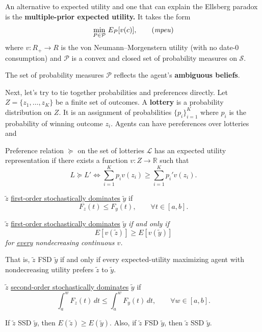 \documentclass[11pt,english]{article}
\begin{document}
\begin{definition} 
An alternative to expected utility and one that can explain the Ellsberg
paradox is the \textbf{multiple-prior expected utility.} It takes the form
\begin{equation}
    \min_{P \in \mathcal{P}}\, E_P[v(c)], \tag{\textit{mpeu}}
\end{equation}
where $v : R_+ \to R$ is the von Neumann--Morgenstern utility (with no date-0
consumption) and $\mathcal{P}$ is a convex and closed set of probability
measures on $\mathcal{S}$.
 
The set of probability measures $\mathcal{P}$ reflects the agent's
\textbf{ambiguous beliefs}.
\end{definition}
Next, let's try to tie together probabilities and preferences directly. Let $Z  = \{z_1, \ldots, z_K\}$ be a finite set of outcomes. A \textbf{lottery} is a probability distribution on $Z$. It is an assignment of probabilities $\{p_i\}_{i=1}^K$ where $p_i$ is the probability of winning outcome $z_i$. Agents can have pereferences over lotteries and 
\begin{definition}
Preference relation $\succeq$ on the set of lotteries $\mathcal{L}$ has an expected utility representation if there exists a function $v:Z\to \mathbb{R}$ such that $$L\succeq L'\Longleftrightarrow \sum_{i=1}^Kp_iv(z_i) \geq \sum_{i=1}^Kp_i'v(z_i).$$
\end{definition}
\begin{definition}[Definition 18.1]
$\tilde{z}$ \underline{first-order stochastically dominates} $\tilde{y}$ if
\begin{equation}
    F_z(t) \leq F_y(t), \qquad \forall t \in [a, b].
\end{equation}
\end{definition}
 
\begin{theorem}[Theorem 18.2]
$\tilde{z}$ \underline{first-order stochastically dominates} $\tilde{y}$ \textit{if and only if}
\[
    E[v(\tilde{z})] \geq E[v(\tilde{y})]
\]
\textit{for \underline{every} nondecreasing continuous $v$.}
\end{theorem}
That is, $\tilde{z}$ FSD $\tilde{y}$ if and only if every expected-utility
maximizing agent with nondecreasing utility prefers $\tilde{z}$ to $\tilde{y}$.
 
 
\begin{definition}[Definition 18.4]
$\tilde{z}$ \underline{second-order stochastically dominates} $\tilde{y}$ if
\begin{equation}
    \int_a^w F_z(t)\,dt \leq \int_a^w F_y(t)\,dt, \qquad \forall w \in [a, b].
\end{equation}
\end{definition}
If $\tilde{z}$ SSD $\tilde{y}$, then $E(\tilde{z}) \geq E(\tilde{y})$. Also, if $\tilde{z}$ FSD
$\tilde{y}$, then $\tilde{z}$ SSD $\tilde{y}$.
 
\end{document}
